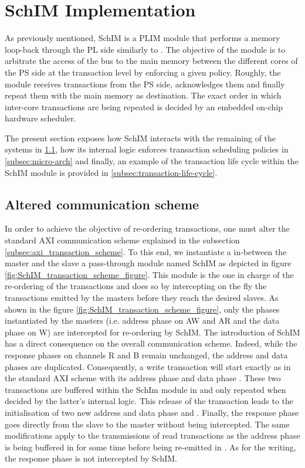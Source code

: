 \section{SchIM Implementation}
    As previously mentioned, SchIM is a PLIM module that performs a memory loop-back through the PL side similarly to \cite{PLIM20}.
    The objective of the module is to arbitrate the access of the bus to the main memory between the different cores of the PS side at the transaction level by enforcing a given policy.
    Roughly, the module receives transactions from the PS side, acknowledges them and finally repeat them with the main memory as destination.
    The exact order in which inter-core transactions are being repeated is decided by an embedded on-chip hardware scheduler.

    The present section exposes how SchIM interacts with the remaining of the systems in \ref{subsec:communication-scheme}, how its internal logic enforces transaction scheduling policies in \ref{subsec:micro-arch} and finally, an example of the transaction life cycle within the SchIM module is provided in \ref{subsec:transaction-life-cycle}.

    \subsection{Altered communication scheme}
        \label{subsec:communication-scheme}
        In order to achieve the objective of re-ordering transactions, one must alter the standard AXI communication scheme explained in the subsection \ref{subsec:axi_transaction_scheme}.
        To this end, we instantiate a in-between the master and the slave a pass-through module named SchIM as depicted in figure \ref{fig:SchIM_transaction_scheme_figure}.
        This module is the one in charge of the re-ordering of the transactions and does so by intercepting on the fly the transactions emitted by the masters before they reach the desired slaves.
        As shown in the figure \ref{fig:SchIM_transaction_scheme_figure}, only the phases instantiated by the masters (i.e. address phase on AW and AR and the data phase on W) are intercepted for re-ordering by SchIM.
        The introduction of SchIM has a direct consequence on the overall communication scheme. Indeed, while the response phases on channels R and B remain unchanged, the address and data phases are duplicated.
        Consequently, a write transaction will start exactly as in the standard AXI scheme with its address phase  and data phase .
        These two transactions are buffered within the SchIm module in  and only repeated when decided by the latter's internal logic.
        This release of the transaction leads to the initialisation of two new address and data phase  and .
        Finally, the response phase  goes directly from the slave to the master without being intercepted.
        The same modifications apply to the transmissions of read transactions as the address phase  is being buffered in  for some time before being re-emitted in .
        As for the writing, the response phase  is not intercepted by SchIM.

